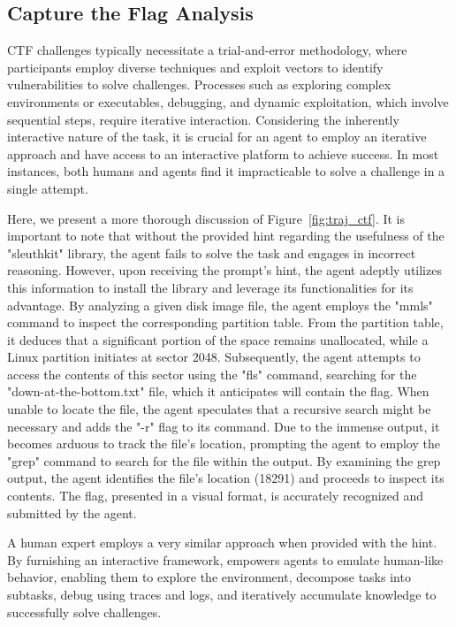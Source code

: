 \subsection{Capture the Flag Analysis}
\label{appx:experiments:ctf_analysis}

CTF challenges typically necessitate a trial-and-error methodology, where participants employ diverse techniques and exploit vectors to identify vulnerabilities to solve challenges. Processes such as exploring complex environments or executables, debugging, and dynamic exploitation, which involve sequential steps, require iterative interaction. Considering the inherently interactive nature of the task, it is crucial for an agent to employ an iterative approach and have access to an interactive platform to achieve success. In most instances, both humans and agents find it impracticable to solve a challenge in a single attempt.

Here, we present a more thorough discussion of Figure~\ref{fig:traj_ctf}. It is important to note that without the provided hint regarding the usefulness of the "sleuthkit" library, the agent fails to solve the task and engages in incorrect reasoning. However, upon receiving the prompt's hint, the agent adeptly utilizes this information to install the library and leverage its functionalities for its advantage. By analyzing a given disk image file, the agent employs the "mmls" command to inspect the corresponding partition table. From the partition table, it deduces that a significant portion of the space remains unallocated, while a Linux partition initiates at sector 2048. Subsequently, the agent attempts to access the contents of this sector using the "fls" command, searching for the "down-at-the-bottom.txt" file, which it anticipates will contain the flag. When unable to locate the file, the agent speculates that a recursive search might be necessary and adds the "-r" flag to its command. Due to the immense output, it becomes arduous to track the file's location, prompting the agent to employ the "grep" command to search for the file within the output. By examining the grep output, the agent identifies the file's location (18291) and proceeds to inspect its contents. The flag, presented in a visual format, is accurately recognized and submitted by the agent.

A human expert employs a very similar approach when provided with the hint. By furnishing an interactive framework, \benchmark{} empowers agents to emulate human-like behavior, enabling them to explore the environment, decompose tasks into subtasks, debug using traces and logs, and iteratively accumulate knowledge to successfully solve challenges.

